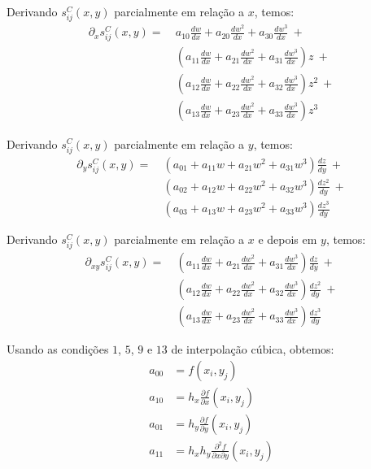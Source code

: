 \documentclass[a4paper, 12pt]{article}
\begin{document}
Derivando $s_{ij}^C(x,y)$ parcialmente em relação a $x$, temos:
\begin{align*}
    \partial_{x}s_{ij}^C(x, y) =\ &a_{10}\frac{dw}{dx} + a_{20}\frac{dw^2}{dx} + a_{30}\frac{dw^3}{dx}\ +         \\
                            &\left(a_{11}\frac{dw}{dx} + a_{21}\frac{dw^2}{dx} + a_{31}\frac{dw^3}{dx}\right)z\ + \\ 
                            &\left(a_{12}\frac{dw}{dx} + a_{22}\frac{dw^2}{dx} + a_{32}\frac{dw^3}{dx}\right)z^2\ + \\ 
                            &\left(a_{13}\frac{dw}{dx} + a_{23}\frac{dw^2}{dx} + a_{33}\frac{dw^3}{dx}\right)z^3 
\end{align*}

Derivando $s_{ij}^C(x,y)$ parcialmente em relação a $y$, temos:
\begin{align*}
    \partial_{y}s_{ij}^C(x, y) =\ &\left(a_{01} + a_{11}w + a_{21}w^2 + a_{31}w^3\right)\frac{dz}{dy}\ + \\ 
                                  &\left(a_{02} + a_{12}w + a_{22}w^2 + a_{32}w^3\right)\frac{dz^2}{dy}\ + \\ 
                                  &\left(a_{03} + a_{13}w + a_{23}w^2 + a_{33}w^3\right)\frac{dz^3}{dy} 
\end{align*}

Derivando $s_{ij}^C(x,y)$ parcialmente em relação a $x$ e depois em $y$, temos:
\begin{align*}
    \partial_{xy}s_{ij}^C(x, y) =\ &\left(a_{11}\frac{dw}{dx} + a_{21}\frac{dw^2}{dx} + a_{31}\frac{dw^3}{dx}\right)
                            \frac{dz}{dy}\ + \\ 
                            &\left(a_{12}\frac{dw}{dx} + a_{22}\frac{dw^2}{dx} + a_{32}\frac{dw^3}{dx}\right)
                            \frac{dz^2}{dy}\ + \\ 
                            &\left(a_{13}\frac{dw}{dx} + a_{23}\frac{dw^2}{dx} + a_{33}\frac{dw^3}{dx}\right)
                            \frac{dz^3}{dy} 
\end{align*}

Usando as condições $1$,  $5$, $9$ e $13$ de interpolação cúbica, obtemos:
\begin{align}
    a_{00} &= f(x_{i}, y_{j}) \tag{17}\\
    a_{10} &= h_{x} \frac{\partial f}{\partial x}(x_{i}, y_{j}) \tag{18} \\
    a_{01} &= h_{y} \frac{\partial f}{\partial y}(x_i, y_j) \tag{19} \\
    a_{11} &= h_x h_y \frac{\partial^2 f}{\partial x \partial y}(x_i, y_j) \tag{20}
\end{align}
\end{document}
